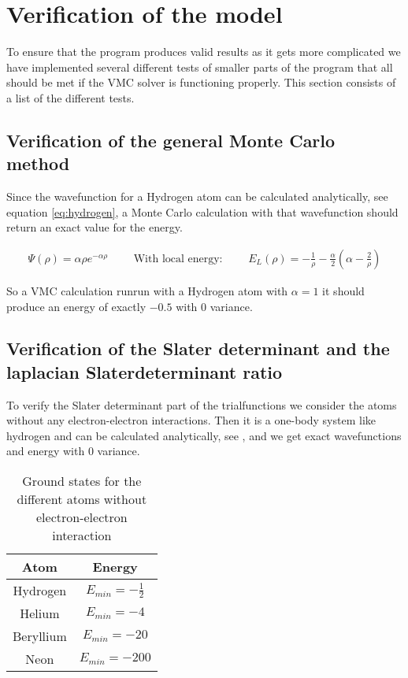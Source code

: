 \section{Verification of the model}
	To ensure that the program produces valid results as it gets more complicated we have implemented several different tests of smaller parts of the program that all should be met if the VMC solver is functioning properly. This section consists of a list of the different tests.
		\subsection{Verification of the general Monte Carlo method}
			Since the wavefunction for a Hydrogen atom can be calculated analytically, see equation \eqref{eq:hydrogen}, a Monte Carlo calculation with that wavefunction should return an exact value for the energy.

			\begin{align}
				 \Psi(\rho ) = \alpha \rho e^{-\alpha\rho} \qquad \text{ With  local energy: } \qquad E_{L} (\rho) = - \frac{1}{\rho} - \frac{\alpha}{2} \left( \alpha - \frac{2}{\rho} \right) \label{eq:hydrogen}
			\end{align}

			So a VMC calculation runrun with a Hydrogen atom with \(\alpha = 1\) it should produce an energy of exactly \( -0.5\) with \(0\) variance. 

		\subsection{Verification of the Slater determinant and the laplacian Slaterdeterminant ratio}
			\label{sec:slaterVerification}
			To verify the Slater determinant part of the trialfunctions we consider the atoms without any electron-electron interactions. Then it is a one-body system like hydrogen and can be calculated analytically, see \cite{griffiths2005introduction},  and we get exact wavefunctions and energy with \(0\) variance. 

			\begin{table}
			\begin{center}
				\begin{tabular}{| c | c |}
				\bottomrule
				Atom & Energy
				\\ \hline
				Hydrogen 	& \( E_{min} = -\frac{1}{2} \)
				\\ \hline
				Helium 		& \( E_{min} = -4\)
				\\ \hline Beryllium		& \( E_{min} = -20 \)
				\\ \hline Neon		& \( E_{min} = -200 \)
				\\ \toprule
				\end{tabular}
			\end{center}
			\caption{Ground states for the different atoms without electron-electron interaction}
			\end{table}

